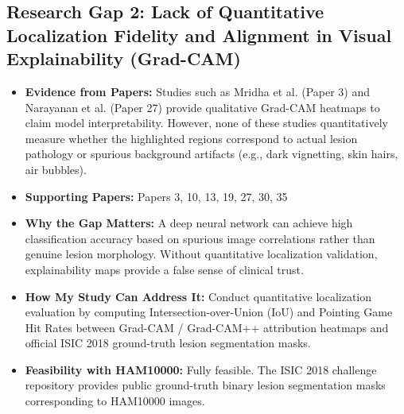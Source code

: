 \documentclass[11pt,a4paper]{article}
\begin{document}
\subsection{Research Gap 2: Lack of Quantitative Localization Fidelity and Alignment in Visual Explainability (Grad-CAM)}
\begin{itemize}
\item \textbf{Evidence from Papers:} Studies such as Mridha et al. (Paper 3) and Narayanan et al. (Paper 27) provide qualitative Grad-CAM heatmaps to claim model interpretability. However, none of these studies quantitatively measure whether the highlighted regions correspond to actual lesion pathology or spurious background artifacts (e.g., dark vignetting, skin hairs, air bubbles).
\item \textbf{Supporting Papers:} Papers 3, 10, 13, 19, 27, 30, 35
\item \textbf{Why the Gap Matters:} A deep neural network can achieve high classification accuracy based on spurious image correlations rather than genuine lesion morphology. Without quantitative localization validation, explainability maps provide a false sense of clinical trust.
\item \textbf{How My Study Can Address It:} Conduct quantitative localization evaluation by computing Intersection-over-Union (IoU) and Pointing Game Hit Rates between Grad-CAM / Grad-CAM++ attribution heatmaps and official ISIC 2018 ground-truth lesion segmentation masks.
\item \textbf{Feasibility with HAM10000:} Fully feasible. The ISIC 2018 challenge repository provides public ground-truth binary lesion segmentation masks corresponding to HAM10000 images.
\end{itemize}
\end{document}
